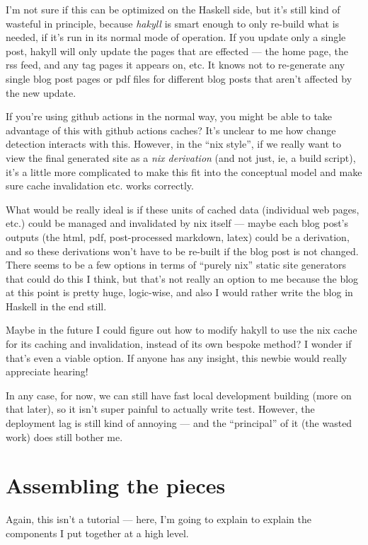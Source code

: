 \documentclass[]{article}
\begin{document}
I'm not sure if this can be optimized on the Haskell side, but it's still kind
of wasteful in principle, because \emph{hakyll} is smart enough to only re-build
what is needed, if it's run in its normal mode of operation. If you update only
a single post, hakyll will only update the pages that are effected --- the home
page, the rss feed, and any tag pages it appears on, etc. It knows not to
re-generate any single blog post pages or pdf files for different blog posts
that aren't affected by the new update.

If you're using github actions in the normal way, you might be able to take
advantage of this with github actions caches? It's unclear to me how change
detection interacts with this. However, in the ``nix style'', if we really want
to view the final generated site as a \emph{nix derivation} (and not just, ie, a
build script), it's a little more complicated to make this fit into the
conceptual model and make sure cache invalidation etc. works correctly.

What would be really ideal is if these units of cached data (individual web
pages, etc.) could be managed and invalidated by nix itself --- maybe each blog
post's outputs (the html, pdf, post-processed markdown, latex) could be a
derivation, and so these derivations won't have to be re-built if the blog post
is not changed. There seems to be a few options in terms of ``purely nix''
static site generators that could do this I think, but that's not really an
option to me because the blog at this point is pretty huge, logic-wise, and also
I would rather write the blog in Haskell in the end still.

Maybe in the future I could figure out how to modify hakyll to use the nix cache
for its caching and invalidation, instead of its own bespoke method? I wonder if
that's even a viable option. If anyone has any insight, this newbie would really
appreciate hearing!

In any case, for now, we can still have fast local development building (more on
that later), so it isn't super painful to actually write test. However, the
deployment lag is still kind of annoying --- and the ``principal'' of it (the
wasted work) does still bother me.

\section{Assembling the pieces}\label{assembling-the-pieces}

Again, this isn't a tutorial --- here, I'm going to explain to explain the
components I put together at a high level.
\end{document}
